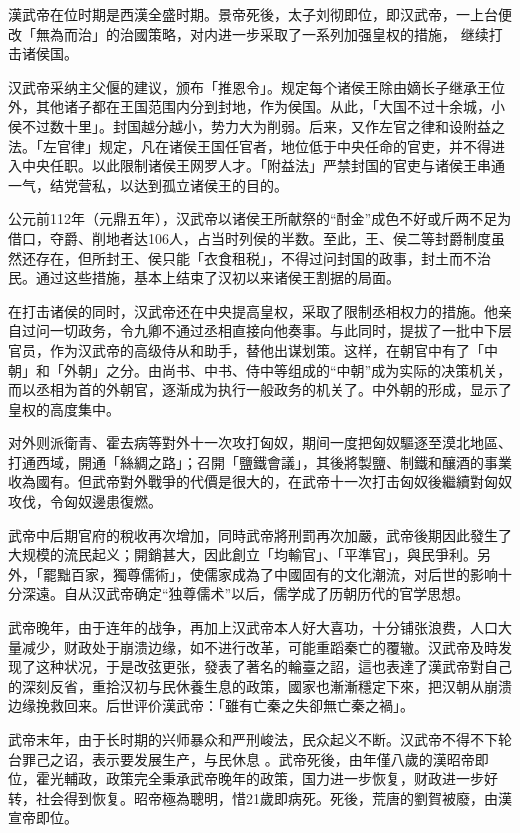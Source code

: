 漢武帝在位时期是西漢全盛时期。景帝死後，太子刘彻即位，即汉武帝，一上台便改「無為而治」的治國策略，对内进一步采取了一系列加强皇权的措施， 继续打击诸侯国。

汉武帝采纳主父偃的建议，颁布「推恩令」。规定每个诸侯王除由嫡长子继承王位外，其他诸子都在王国范围内分到封地，作为侯国。从此，「大国不过十余城，小侯不过数十里」。封国越分越小，势力大为削弱。后来，又作左官之律和设附益之法。「左官律」规定，凡在诸侯王国任官者，地位低于中央任命的官吏，并不得进入中央任职。以此限制诸侯王网罗人才。「附益法」严禁封国的官吏与诸侯王串通一气，结党营私，以达到孤立诸侯王的目的。

公元前112年（元鼎五年），汉武帝以诸侯王所献祭的“酎金”成色不好或斤两不足为借口，夺爵、削地者达106人，占当时列侯的半数。至此，王、侯二等封爵制度虽然还存在，但所封王、侯只能「衣食租税」，不得过问封国的政事，封土而不治民。通过这些措施，基本上结束了汉初以来诸侯王割据的局面。

在打击诸侯的同时，汉武帝还在中央提高皇权，采取了限制丞相权力的措施。他亲自过问一切政务，令九卿不通过丞相直接向他奏事。与此同时，提拔了一批中下层官员，作为汉武帝的高级侍从和助手，替他出谋划策。这样，在朝官中有了「中朝」和「外朝」之分。由尚书、中书、侍中等组成的“中朝”成为实际的决策机关，而以丞相为首的外朝官，逐渐成为执行一般政务的机关了。中外朝的形成，显示了皇权的高度集中。

对外则派衛青、霍去病等對外十一次攻打匈奴，期间一度把匈奴驅逐至漠北地區、打通西域，開通「絲綢之路」；召開「鹽鐵會議」，其後將製鹽、制鐵和釀酒的事業收為國有。但武帝對外戰爭的代價是很大的，在武帝十一次打击匈奴後繼續對匈奴攻伐，令匈奴邊患復燃。

武帝中后期官府的稅收再次增加，同時武帝將刑罰再次加嚴，武帝後期因此發生了大规模的流民起义；開銷甚大，因此創立「均輸官」、「平準官」，與民爭利。另外，「罷黜百家，獨尊儒術」，使儒家成為了中國固有的文化潮流，对后世的影响十分深遠。自从汉武帝确定“独尊儒术”以后，儒学成了历朝历代的官学思想。

武帝晚年，由于连年的战争，再加上汉武帝本人好大喜功，十分铺张浪费，人口大量减少，财政处于崩溃边缘，如不进行改革，可能重蹈秦亡的覆辙。汉武帝及時发现了这种状况，于是改弦更张，發表了著名的輪臺之詔，這也表達了漢武帝對自己的深刻反省，重拾汉初与民休養生息的政策，國家也漸漸穩定下來，把汉朝从崩溃边缘挽救回来。后世评价漢武帝：「雖有亡秦之失卻無亡秦之禍」。

武帝末年，由于长时期的兴师暴众和严刑峻法，民众起义不断。汉武帝不得不下轮台罪己之诏，表示要发展生产，与民休息 。武帝死後，由年僅八歲的漢昭帝即位，霍光輔政，政策完全秉承武帝晚年的政策，国力进一步恢复，财政进一步好转，社会得到恢复。昭帝極為聰明，惜21歲即病死。死後，荒唐的劉賀被廢，由漢宣帝即位。

